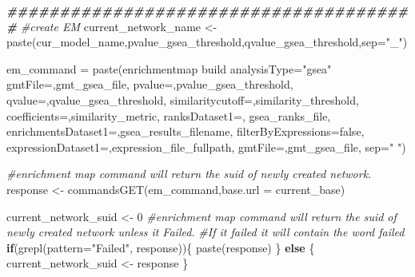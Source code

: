 \documentclass[
]{book}
\newenvironment{Shaded}{\begin{snugshade}}{\end{snugshade}}
\newcommand{\AttributeTok}[1]{\textcolor[rgb]{0.77,0.63,0.00}{#1}}
\newcommand{\CommentTok}[1]{\textcolor[rgb]{0.56,0.35,0.01}{\textit{#1}}}
\newcommand{\ControlFlowTok}[1]{\textcolor[rgb]{0.13,0.29,0.53}{\textbf{#1}}}
\newcommand{\DecValTok}[1]{\textcolor[rgb]{0.00,0.00,0.81}{#1}}
\newcommand{\DocumentationTok}[1]{\textcolor[rgb]{0.56,0.35,0.01}{\textbf{\textit{#1}}}}
\newcommand{\FunctionTok}[1]{\textcolor[rgb]{0.00,0.00,0.00}{#1}}
\newcommand{\NormalTok}[1]{#1}
\newcommand{\OtherTok}[1]{\textcolor[rgb]{0.56,0.35,0.01}{#1}}
\newcommand{\StringTok}[1]{\textcolor[rgb]{0.31,0.60,0.02}{#1}}
\begin{document}
\begin{Shaded}
\begin{Highlighting}[]
\DocumentationTok{\#\#\#\#\#\#\#\#\#\#\#\#\#\#\#\#\#\#\#\#\#\#\#\#\#\#\#\#\#\#\#\#\#\#\#\#\#\#\#}
\CommentTok{\#create EM}
\NormalTok{current\_network\_name }\OtherTok{\textless{}{-}} \FunctionTok{paste}\NormalTok{(cur\_model\_name,pvalue\_gsea\_threshold,qvalue\_gsea\_threshold,}\AttributeTok{sep=}\StringTok{"\_"}\NormalTok{)}

\NormalTok{em\_command }\OtherTok{=} \FunctionTok{paste}\NormalTok{(}\StringTok{\textquotesingle{}enrichmentmap build analysisType="gsea" gmtFile=\textquotesingle{}}\NormalTok{,gmt\_gsea\_file,}
                   \StringTok{\textquotesingle{}pvalue=\textquotesingle{}}\NormalTok{,pvalue\_gsea\_threshold, }\StringTok{\textquotesingle{}qvalue=\textquotesingle{}}\NormalTok{,qvalue\_gsea\_threshold,}
                   \StringTok{\textquotesingle{}similaritycutoff=\textquotesingle{}}\NormalTok{,similarity\_threshold,}
                   \StringTok{\textquotesingle{}coefficients=\textquotesingle{}}\NormalTok{,similarity\_metric,}
                   \StringTok{\textquotesingle{}ranksDataset1=\textquotesingle{}}\NormalTok{, gsea\_ranks\_file,}
                   \StringTok{\textquotesingle{}enrichmentsDataset1=\textquotesingle{}}\NormalTok{,gsea\_results\_filename, }
                   \StringTok{\textquotesingle{}filterByExpressions=false\textquotesingle{}}\NormalTok{,}
                   \StringTok{\textquotesingle{}expressionDataset1=\textquotesingle{}}\NormalTok{,expression\_file\_fullpath,}
                   \StringTok{\textquotesingle{}gmtFile=\textquotesingle{}}\NormalTok{,gmt\_gsea\_file,}
                   \AttributeTok{sep=}\StringTok{" "}\NormalTok{)}

\CommentTok{\#enrichment map command will return the suid of newly created network.}
\NormalTok{response }\OtherTok{\textless{}{-}} \FunctionTok{commandsGET}\NormalTok{(em\_command,}\AttributeTok{base.url =}\NormalTok{ current\_base)}

\NormalTok{current\_network\_suid }\OtherTok{\textless{}{-}} \DecValTok{0}
\CommentTok{\#enrichment map command will return the suid of newly created network unless it Failed.  }
\CommentTok{\#If it failed it will contain the word failed}
\ControlFlowTok{if}\NormalTok{(}\FunctionTok{grepl}\NormalTok{(}\AttributeTok{pattern=}\StringTok{"Failed"}\NormalTok{, response))\{}
  \FunctionTok{paste}\NormalTok{(response)}
\NormalTok{\} }\ControlFlowTok{else}\NormalTok{ \{}
\NormalTok{  current\_network\_suid }\OtherTok{\textless{}{-}}\NormalTok{ response}
\NormalTok{\}}


\end{Highlighting}
\end{Shaded}
\end{document}
